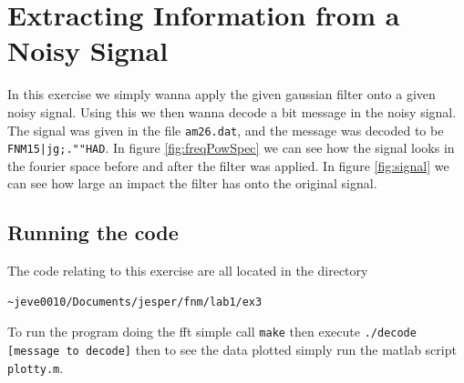 \documentclass[11pt]{article}
\newlength\figureheight
\newlength\figurewidth
\newif\iftikz
\begin{document}
\section{Extracting Information from a Noisy Signal}
In this exercise we simply wanna apply the given gaussian filter onto a given noisy signal. Using this we then wanna decode a bit message in the noisy signal. The signal was given in the file \verb+am26.dat+, and the message was decoded to be \verb+FNM15|jg;.""HAD+. In figure \ref{fig:freqPowSpec} we can see how the signal looks in the fourier space before and after the filter was applied. In figure \ref{fig:signal} we can see how large an impact the filter has onto the original signal. 
\iftikz
\begin{figure}[H]
	\centering
	\setlength\figureheight{8cm} 
	\setlength\figurewidth{6cm}
	
	\caption{Here we clearly depict the difference in the fourier space before and after the filtering.}
	\label{fig:freqPowSpec}
\end{figure}
\fi
\iftikz
\begin{figure}[H]
	\centering
	\setlength\figureheight{8cm} 
	\setlength\figurewidth{6cm}
	
	\caption{Here we clearly depict the difference in the time space before and after the filtering.}
	\label{fig:signal}
\end{figure}
\fi
\subsection{Running the code}
The code relating to this exercise are all located in the directory
\begin{verbatim}
~jeve0010/Documents/jesper/fnm/lab1/ex3
\end{verbatim}
To run the program doing the fft simple call \verb+make+ then execute \verb+./decode [message to decode]+ then to see the data plotted simply run the matlab script \verb+plotty.m+.
\end{document}
